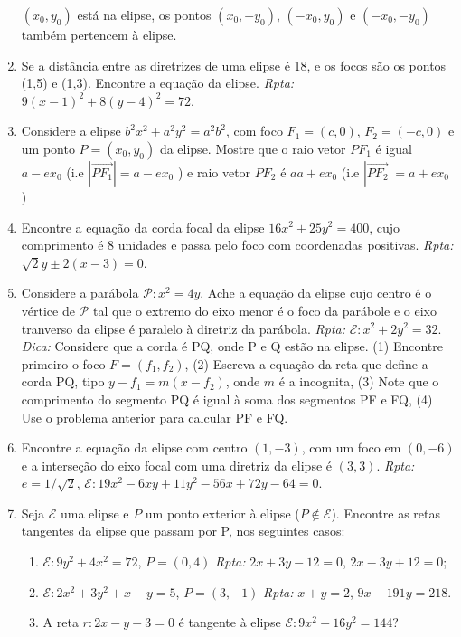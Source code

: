 \documentclass{article}
\begin{document}
\begin{enumerate}
    $(x_0,y_0)$ está na elipse, os pontos 
    $(x_0,-y_0)$, $(-x_0,y_0)$ e $(-x_0,-y_0)$ também pertencem à elipse. 
    \item Se a distância entre as diretrizes de uma elipse é 18, e os focos 
    são os pontos (1,5) e (1,3). Encontre a equação da elipse. 
    {\it Rpta: } $9(x-1)^2+8(y-4)^2=72$.
    \item Considere a elipse $b^2x^2+a^2y^2=a^2b^2$, com 
    foco $F_1=(c,0)$, $F_2=(-c,0)$ e um ponto 
    $P=(x_0,y_0)$ da elipse. Mostre que 
    o raio vetor $PF_1$ é igual $a-ex_0$ 
    (i.e $|\overrightarrow{PF_1}|=a-ex_0$ )
    e  raio vetor $PF_2$ é $a a+ex_0$ 
    (i.e $|\overrightarrow{PF_2}|=a+ex_0$ )
    \item Encontre a equação da corda focal da 
    elipse $16x^2+25y^2=400$, cujo comprimento é 8 unidades e 
    passa pelo foco com coordenadas positivas. {\it Rpta: }
    $\sqrt{2}y\pm 2(x-3)=0$.
    \item Considere a parábola $\mathcal{P}: x^2=4y$. 
    Ache a  equação da elipse 
    cujo centro é o vértice de $\mathcal{P}$ tal que o 
    extremo do eixo menor é o foco da parábole 
    e o eixo tranverso da elipse é paralelo à diretriz da parábola. 
    {\it Rpta: } $\mathcal{E}: x^2+2y^2=32$.
    {\it Dica: } Considere que a corda é PQ, onde P e Q estão na elipse. 
    (1) Encontre primeiro o foco $F=(f_1,f_2)$,  
    (2) Escreva a equação da reta que define a corda PQ,
    tipo $y-f_1=m(x-f_2)$, onde $m$ é a incognita,  
    (3) Note que o comprimento do segmento PQ é igual à soma dos segmentos
    PF e FQ, (4) Use o problema anterior para calcular PF e FQ. 
    \item Encontre a equação da elipse com centro $(1,-3)$, com um foco 
    em $(0,-6)$ e a interseção do eixo focal com uma diretriz da elipse 
    é $(3,3)$. {\it Rpta: } $e=1/\sqrt{2}$, $\mathcal{E}: 19x^2-6xy+11y^2-56x+72y-64=0$.
    \item Seja $\mathcal{E}$ uma elipse e $P$ um ponto exterior à elipse 
    ($P \notin \mathcal{E}$). Encontre as retas tangentes da elipse que passam por P, nos seguintes casos: 
       \begin{enumerate}
       \item $\mathcal{E}: 9y^2+4x^2=72$, $P=(0,4)$ 
       {\it Rpta: } $2x+3y-12=0$, $2x-3y+12=0$;
       \item $\mathcal{E}: 2x^2+3y^2+x-y=5$, $P=(3,-1)$
       {\it Rpta: } $x+y=2$, $9x-191y=218$.
       \item A reta $r: 2x-y-3=0$ é tangente à elipse 
       $\mathcal{E}:9x^2+16y^2=144$? 

\end{enumerate}
\end{enumerate}
\end{document}
